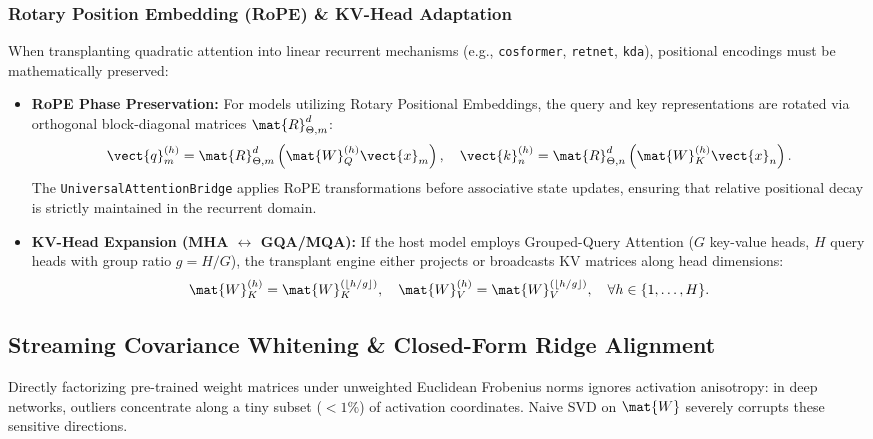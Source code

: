 \subsubsection{Rotary Position Embedding (RoPE) \& KV-Head Adaptation}
When transplanting quadratic attention into linear recurrent mechanisms (e.g., \texttt{cosformer}, \texttt{retnet}, \texttt{kda}), positional encodings must be mathematically preserved:
\begin{itemize}
    \item \textbf{RoPE Phase Preservation:} For models utilizing Rotary Positional Embeddings, the query and key representations are rotated via orthogonal block-diagonal matrices $\mat{R}_{\Theta, m}^d$:
    \begin{equation}
    \vect{q}_m^{(h)} = \mat{R}_{\Theta, m}^d \left( \mat{W}_Q^{(h)} \vect{x}_m \right), \quad \vect{k}_n^{(h)} = \mat{R}_{\Theta, n}^d \left( \mat{W}_K^{(h)} \vect{x}_n \right).
    \end{equation}
    The \texttt{UniversalAttentionBridge} applies RoPE transformations before associative state updates, ensuring that relative positional decay is strictly maintained in the recurrent domain.
    \item \textbf{KV-Head Expansion (MHA $\longleftrightarrow$ GQA/MQA):} If the host model employs Grouped-Query Attention ($G$ key-value heads, $H$ query heads with group ratio $g = H/G$), the transplant engine either projects or broadcasts KV matrices along head dimensions:
    \begin{equation}
    \mat{W}_K^{(h)} = \mat{W}_K^{(\lfloor h / g \rfloor)}, \quad \mat{W}_V^{(h)} = \mat{W}_V^{(\lfloor h / g \rfloor)}, \quad \forall h \in \{1, \dots, H\}.
    \end{equation}
\end{itemize}

\subsection{Streaming Covariance Whitening \& Closed-Form Ridge Alignment}
\label{sec:surgery_whitening_ridge}

Directly factorizing pre-trained weight matrices under unweighted Euclidean Frobenius norms ignores activation anisotropy: in deep networks, outliers concentrate along a tiny subset ($<1\%$) of activation coordinates. Naive SVD on $\mat{W}$ severely corrupts these sensitive directions.

